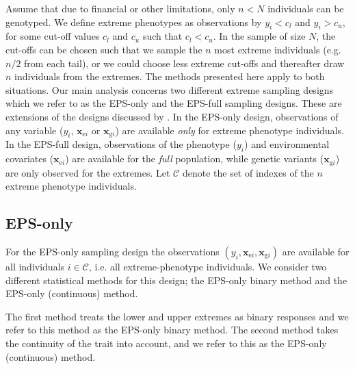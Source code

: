 \documentclass[10pt,a4paper]{article}
\def\bxgi{\mathbf{x}_{\text{g}i}}
\def\bxei{\mathbf{x}_{\text{e}i}}
\begin{document}
Assume that due to financial or other limitations, only $n < N$ individuals can be genotyped. We define extreme phenotypes as observations by $y_i < c_l$ and $y_i > c_u$, for some cut-off values $c_l$ and $c_u$ such that $c_l < c_u$. In the sample of size $N$, the cut-offs can be chosen such that we sample the $n$ most extreme individuals (e.g. $n/2$ from each tail), or we could choose less extreme cut-offs and thereafter draw $n$ individuals from the extremes. The methods presented here apply to both situations. Our main analysis concerns two different extreme sampling designs which we refer to as the EPS-only and the EPS-full sampling designs. These are extensions of the designs discussed by \cite{huang2007eps}. In the EPS-only design, observations of any variable ($y_i$, $\bxei$ or $\bxgi$) are available \textit{only} for extreme phenotype individuals. In the EPS-full design, observations of the phenotype ($y_i$) and environmental covariates ($\bxei$) are available for the \textit{full} population, while genetic variants ($\bxgi$) are only observed for the extremes. Let $\mathcal{C}$ denote the set of indexes of the $n$ extreme phenotype individuals.

\subsection{EPS-only}
For the EPS-only sampling design the observations $(y_i,\bxei,\bxgi)$ are available for all individuals $i \in \mathcal{C}$, i.e. all extreme-phenotype individuals. We consider two different statistical methods for this design; the EPS-only binary method and the EPS-only (continuous) method.

 The first method treats the lower and upper extremes as binary responses and we refer to this method as the EPS-only binary method. The second method takes the continuity of the trait into account, and we refer to this as the EPS-only (continuous) method.
\end{document}
